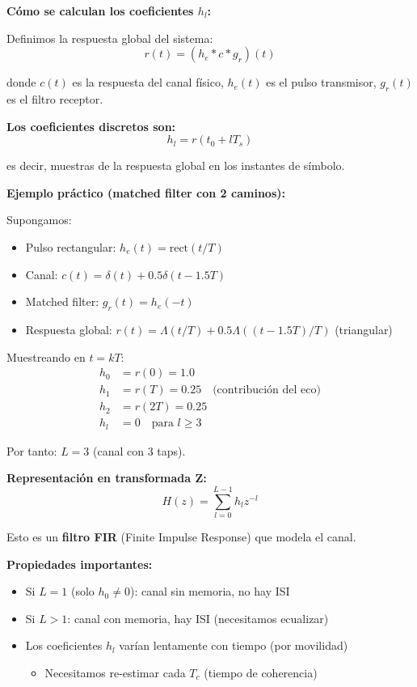 \documentclass[10pt,a4paper]{article}
\begin{document}
\textbf{Cómo se calculan los coeficientes $h_l$:}

Definimos la respuesta global del sistema:
$$r(t) = (h_e * c * g_r)(t)$$

donde $c(t)$ es la respuesta del canal físico, $h_e(t)$ es el pulso transmisor, $g_r(t)$ es el filtro receptor.

\textbf{Los coeficientes discretos son:}
$$\boxed{h_l = r(t_0 + lT_s)}$$

es decir, muestras de la respuesta global en los instantes de símbolo.

\textbf{Ejemplo práctico (matched filter con 2 caminos):}

Supongamos:
\begin{itemize}
\item Pulso rectangular: $h_e(t) = \text{rect}(t/T)$
\item Canal: $c(t) = \delta(t) + 0.5\delta(t - 1.5T)$
\item Matched filter: $g_r(t) = h_e(-t)$
\item Respuesta global: $r(t) = \Lambda(t/T) + 0.5\Lambda((t-1.5T)/T)$ (triangular)
\end{itemize}

Muestreando en $t = kT$:
\begin{align*}
h_0 &= r(0) = 1.0\\
h_1 &= r(T) = 0.25 \quad \text{(contribución del eco)}\\
h_2 &= r(2T) = 0.25\\
h_l &= 0 \quad \text{para } l \geq 3
\end{align*}

Por tanto: $L = 3$ (canal con 3 taps).

\textbf{Representación en transformada Z:}
$$H(z) = \sum_{l=0}^{L-1} h_l z^{-l}$$

Esto es un \textbf{filtro FIR} (Finite Impulse Response) que modela el canal.

\textbf{Propiedades importantes:}
\begin{itemize}
\item Si $L = 1$ (solo $h_0 \neq 0$): canal sin memoria, no hay ISI
\item Si $L > 1$: canal con memoria, hay ISI (necesitamos ecualizar)
\item Los coeficientes $h_l$ varían lentamente con tiempo (por movilidad)
  \begin{itemize}
  \item Necesitamos re-estimar cada $T_c$ (tiempo de coherencia)
  \end{itemize}
\end{itemize}
\end{document}
